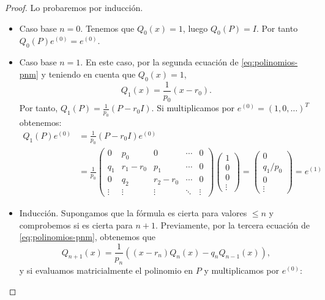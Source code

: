     \begin{proof}
        Lo probaremos por inducción.
        \begin{itemize}
            \item Caso base $n=0$. Tenemos que $Q_0(x)=1$, luego $Q_0(P)=I$. Por tanto $Q_0(P) e^{(0)} = e^{(0)}$.
            \item Caso base $n=1$. En este caso, por la segunda ecuación de \eqref{eq:polinomios-pnm} y teniendo en cuenta que $Q_0(x)=1$,
            $$
            Q_1(x) = \frac{1}{p_0}(x-r_0).
            $$
            Por tanto, $Q_1(P) = \frac{1}{p_0}(P-r_0 I)$. Si multiplicamos por $e^{(0)}=(1,0,\dots)^T$ obtenemos:
            \begin{equation*}
                \begin{split}
                    Q_1(P)e^{(0)} &=  \frac{1}{p_0}(P-r_0 I) e^{(0)} \\
                    &=  \frac{1}{p_0} \begin{pmatrix}
                        0 & p_0 & 0  & \cdots & 0 \\
                        q_1 & r_1-r_0 & p_1 & \cdots & 0 \\
                        0 & q_2 & r_2-r_0 & \cdots & 0 \\
                        \vdots & \vdots & \vdots &\ddots & \vdots
                    \end{pmatrix} \begin{pmatrix}
                        1 \\ 0 \\ 0 \\ \vdots 
                    \end{pmatrix} = \begin{pmatrix}
                        0 \\ q_1/p_0 \\ 0 \\ \vdots
                    \end{pmatrix}= e^{(1)}
                \end{split}
            \end{equation*}
            \item Inducción. Supongamos que la fórmula es cierta para valores $\leq n$ y comprobemos si es cierta para $n+1$. Previamente, por la tercera ecuación de \eqref{eq:polinomios-pnm}, obtenemos que 
            $$
            Q_{n+1}(x) = \dfrac{1}{p_n}((x-r_n)Q_n(x)-q_n Q_{n-1}(x)),
            $$
            y si evaluamos matricialmente el polinomio en $P$ y multiplicamos por $e^{(0)}$:

\end{itemize}
\end{proof}
